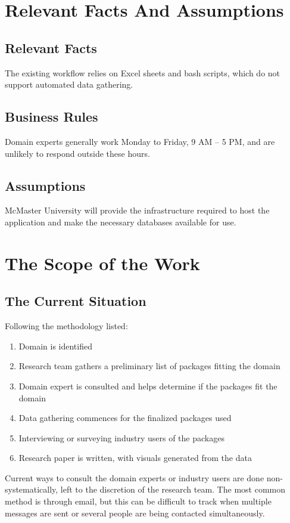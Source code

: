 \documentclass[12pt]{article}
\begin{document}
\section{Relevant Facts And Assumptions}
\subsection{Relevant Facts}
The existing workflow relies on Excel sheets and bash scripts, which do not support automated data gathering.
\subsection{Business Rules}
Domain experts generally work Monday to Friday, 9 AM – 5 PM, and are unlikely to respond outside these hours.
\subsection{Assumptions}
McMaster University will provide the infrastructure required to host the application and make the necessary databases available for use.

\section{The Scope of the Work}
\subsection{The Current Situation}
Following the methodology listed:

\begin{enumerate}
    \item Domain is identified
    \item Research team gathers a preliminary list of packages fitting the domain
    \item Domain expert is consulted and helps determine if the packages fit the domain
    \item Data gathering commences for the finalized packages used
    \item Interviewing or surveying industry users of the packages
    \item Research paper is written, with visuals generated from the data
\end{enumerate}

Current ways to consult the domain experts or industry users are done non-systematically, left to the discretion of the research team. The most common method is through email, but this can be difficult to track when multiple messages are sent or several people are being contacted simultaneously.
\end{document}
